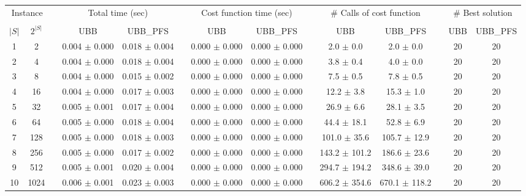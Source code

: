 \documentclass[11pt]{article}
\begin{document}
\begin{landscape}
\begin{table}
\centering
\footnotesize
\begin{tabular}{cccccccccccccc}
\toprule
\multicolumn{2}{c}{Instance} & \phantom{} & \multicolumn{2}{c}{Total time (sec)}  & \phantom{} & \multicolumn{2}{c}{Cost function time (sec)}  & \phantom{} & \multicolumn{2}{c}{\# Calls of cost function}  & \phantom{} & \multicolumn{2}{c}{\# Best solution}\\
\cline{1-2}\cline{4-5}\cline{7-8}\cline{10-11}\cline{13-14}\\
$|S|$ & $2^{|S|}$ && UBB & UBB_PFS && UBB & UBB_PFS && UBB & UBB_PFS && UBB & UBB_PFS \\
 1 &       2 &&  0.004 $\pm$ 0.000 & 0.018 $\pm$ 0.004 &&  0.000 $\pm$ 0.000 & 0.000 $\pm$ 0.000 &&   2.0 $\pm$  0.0 &  2.0 $\pm$  0.0 && 20& 20\\
 2 &       4 &&  0.004 $\pm$ 0.000 & 0.018 $\pm$ 0.004 &&  0.000 $\pm$ 0.000 & 0.000 $\pm$ 0.000 &&   3.8 $\pm$  0.4 &  4.0 $\pm$  0.0 && 20& 20\\
 3 &       8 &&  0.004 $\pm$ 0.000 & 0.015 $\pm$ 0.002 &&  0.000 $\pm$ 0.000 & 0.000 $\pm$ 0.000 &&   7.5 $\pm$  0.5 &  7.8 $\pm$  0.5 && 20& 20\\
 4 &      16 &&  0.004 $\pm$ 0.000 & 0.017 $\pm$ 0.003 &&  0.000 $\pm$ 0.000 & 0.000 $\pm$ 0.000 &&  12.2 $\pm$  3.8 & 15.3 $\pm$  1.0 && 20& 20\\
 5 &      32 &&  0.005 $\pm$ 0.001 & 0.017 $\pm$ 0.004 &&  0.000 $\pm$ 0.000 & 0.000 $\pm$ 0.000 &&  26.9 $\pm$  6.6 & 28.1 $\pm$  3.5 && 20& 20\\
 6 &      64 &&  0.005 $\pm$ 0.000 & 0.018 $\pm$ 0.004 &&  0.000 $\pm$ 0.000 & 0.000 $\pm$ 0.000 &&  44.4 $\pm$ 18.1 & 52.8 $\pm$  6.9 && 20& 20\\
 7 &     128 &&  0.005 $\pm$ 0.000 & 0.018 $\pm$ 0.003 &&  0.000 $\pm$ 0.000 & 0.000 $\pm$ 0.000 &&  101.0 $\pm$ 35.6 & 105.7 $\pm$ 12.9 && 20& 20\\
 8 &     256 &&  0.005 $\pm$ 0.000 & 0.017 $\pm$ 0.002 &&  0.000 $\pm$ 0.000 & 0.000 $\pm$ 0.000 &&  143.2 $\pm$ 101.2 & 186.6 $\pm$ 23.6 && 20& 20\\
 9 &     512 &&  0.005 $\pm$ 0.001 & 0.020 $\pm$ 0.004 &&  0.000 $\pm$ 0.000 & 0.000 $\pm$ 0.000 &&  294.7 $\pm$ 194.2 & 348.6 $\pm$ 39.0 && 20& 20\\
10 &    1024 &&  0.006 $\pm$ 0.001 & 0.023 $\pm$ 0.003 &&  0.000 $\pm$ 0.000 & 0.000 $\pm$ 0.000 &&  606.2 $\pm$ 354.6 & 670.1 $\pm$ 118.2 && 20& 20\\

\end{tabular}
\end{table}
\end{landscape}
\end{document}
